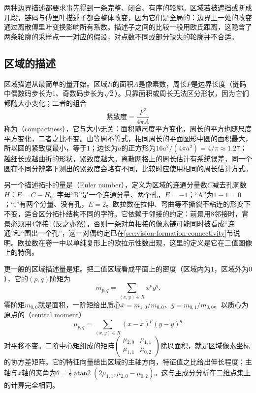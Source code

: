 两种边界描述都要求事先得到一条完整、闭合、有序的轮廓。区域若被遮挡或断成几段，链码与傅里叶描述子都会整体改变，因为它们是全局的：边界上一处的改变通过离散傅里叶变换影响所有系数。描述子之间的比较一般用欧氏距离，这隐含了两条轮廓的采样点一一对应的假设，对点数不同或部分缺失的轮廓并不合适。

\subsection{区域的描述}
\label{sec:vision-features-region}

区域描述从最简单的量开始。区域$R$的面积$A$是像素数，周长$P$是边界长度（链码中偶数码步长为$1$、奇数码步长为$\sqrt2$）。只靠面积或周长无法区分形状，因为它们都随大小变化；二者的组合
\begin{equation}
  \text{紧致度}=\frac{P^2}{4\pi A}
  \label{eq:vision-features-compactness}
\end{equation}
称为（compactness），它与大小无关：面积随尺度平方变化，周长的平方也随尺度平方变化，二者之比不变。由等周不等式，相同周长的平面图形中圆的面积最大，所以圆的紧致度最小，等于$1$；边长为$a$的正方形为$16a^2/(4\pi a^2)=4/\pi\approx1.27$；越细长或越曲折的形状，紧致度越大。离散网格上的周长估计有系统误差，同一个圆在不同分辨率下测出的紧致度会略有不同，比较时应使用相同的周长估计方式。

另一个描述拓扑的量是（Euler number），定义为区域的连通分量数$C$减去孔洞数$H$：$E=C-H$。字母“B”是一个连通分量、两个孔，$E=-1$；“A”为$1-1=0$；“i”有两个分量、没有孔，$E=2$。欧拉数在拉伸、弯曲等不撕裂不粘连的形变下不变，适合区分拓扑结构不同的字符。它依赖于邻接的约定：前景用$8$邻接时，背景必须用$4$邻接（反之亦然），否则一条对角相接的像素链可能同时被看成“连通”和“围出一个孔”，这一对偶约定已在\ref{sec:vision-formation-connectivity}节说明。欧拉数在卷一中以单纯复形上的欧拉示性数出现，这里的定义是它在二值图像上的特例。

更一般的区域描述量是矩。把二值区域看成平面上的密度（区域内为$1$，区域外为$0$），它的$(p,q)$阶矩为
\[
  m_{p,q}=\sum_{(x,y)\in R}x^py^q.
\]
零阶矩$m_{0,0}$就是面积，一阶矩给出质心$\bar x=m_{1,0}/m_{0,0}$、$\bar y=m_{0,1}/m_{0,0}$。以质心为原点的（central moment）
\[
  \mu_{p,q}=\sum_{(x,y)\in R}(x-\bar x)^p(y-\bar y)^q
\]
对平移不变。二阶中心矩组成的矩阵$\begin{pmatrix}\mu_{2,0}&\mu_{1,1}\\\mu_{1,1}&\mu_{0,2}\end{pmatrix}$除以面积，就是区域像素坐标的协方差矩阵。它的特征向量给出区域的主轴方向，特征值之比给出伸长程度；主轴与$x$轴的夹角为$\theta=\tfrac12\operatorname{atan2}(2\mu_{1,1},\mu_{2,0}-\mu_{0,2})$。这与主成分分析在二维点集上的计算完全相同。

